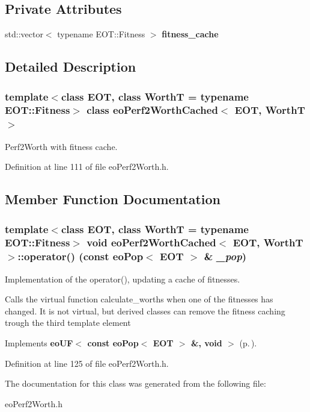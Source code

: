 \subsection*{Private Attributes}
\begin{CompactItemize}
\item 
std::vector$<$ typename EOT::Fitness $>$ {\bf fitness\_\-cache}\label{classeo_perf2_worth_cached_r0}

\end{CompactItemize}


\subsection{Detailed Description}
\subsubsection*{template$<$class EOT, class Worth\-T = typename EOT::Fitness$>$ class eo\-Perf2Worth\-Cached$<$ EOT, Worth\-T $>$}

Perf2Worth with fitness cache. 



Definition at line 111 of file eo\-Perf2Worth.h.

\subsection{Member Function Documentation}
\subsubsection{\setlength{\rightskip}{0pt plus 5cm}template$<$class EOT, class Worth\-T = typename EOT::Fitness$>$ void {\bf eo\-Perf2Worth\-Cached}$<$ {\bf EOT}, Worth\-T $>$::operator() (const {\bf eo\-Pop}$<$ {\bf EOT} $>$ \& {\em \_\-pop})\hspace{0.3cm}{\tt  [inline, virtual]}}\label{classeo_perf2_worth_cached_a1}


Implementation of the operator(), updating a cache of fitnesses. 

Calls the virtual function calculate\_\-worths when one of the fitnesses has changed. It is not virtual, but derived classes can remove the fitness caching trough the third template element 

Implements {\bf eo\-UF$<$ const eo\-Pop$<$ EOT $>$ \&, void $>$} {\rm (p.\,\pageref{classeo_u_f_a1})}.

Definition at line 125 of file eo\-Perf2Worth.h.

The documentation for this class was generated from the following file:\begin{CompactItemize}
\item 
eo\-Perf2Worth.h\end{CompactItemize}
